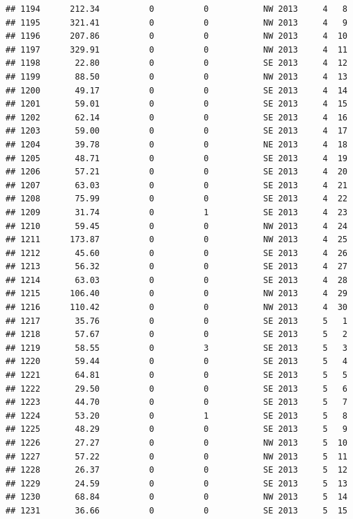 \documentclass[
]{article}
\begin{document}
\begin{verbatim}
## 1194      212.34          0          0           NW 2013     4   8
## 1195      321.41          0          0           NW 2013     4   9
## 1196      207.86          0          0           NW 2013     4  10
## 1197      329.91          0          0           NW 2013     4  11
## 1198       22.80          0          0           SE 2013     4  12
## 1199       88.50          0          0           NW 2013     4  13
## 1200       49.17          0          0           SE 2013     4  14
## 1201       59.01          0          0           SE 2013     4  15
## 1202       62.14          0          0           SE 2013     4  16
## 1203       59.00          0          0           SE 2013     4  17
## 1204       39.78          0          0           NE 2013     4  18
## 1205       48.71          0          0           SE 2013     4  19
## 1206       57.21          0          0           SE 2013     4  20
## 1207       63.03          0          0           SE 2013     4  21
## 1208       75.99          0          0           SE 2013     4  22
## 1209       31.74          0          1           SE 2013     4  23
## 1210       59.45          0          0           NW 2013     4  24
## 1211      173.87          0          0           NW 2013     4  25
## 1212       45.60          0          0           SE 2013     4  26
## 1213       56.32          0          0           SE 2013     4  27
## 1214       63.03          0          0           SE 2013     4  28
## 1215      106.40          0          0           NW 2013     4  29
## 1216      110.42          0          0           NW 2013     4  30
## 1217       35.76          0          0           SE 2013     5   1
## 1218       57.67          0          0           SE 2013     5   2
## 1219       58.55          0          3           SE 2013     5   3
## 1220       59.44          0          0           SE 2013     5   4
## 1221       64.81          0          0           SE 2013     5   5
## 1222       29.50          0          0           SE 2013     5   6
## 1223       44.70          0          0           SE 2013     5   7
## 1224       53.20          0          1           SE 2013     5   8
## 1225       48.29          0          0           SE 2013     5   9
## 1226       27.27          0          0           NW 2013     5  10
## 1227       57.22          0          0           NW 2013     5  11
## 1228       26.37          0          0           SE 2013     5  12
## 1229       24.59          0          0           SE 2013     5  13
## 1230       68.84          0          0           NW 2013     5  14
## 1231       36.66          0          0           SE 2013     5  15

\end{verbatim}
\end{document}
